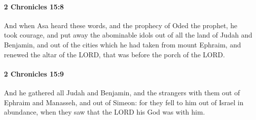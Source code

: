 		\paragraph{2 Chronicles 15:8} %
			\label{2CHRONICLES-15-8}

			And when Asa heard these words, and the prophecy of Oded the prophet, he took courage, and put away the abominable idols out of all the land of Judah and Benjamin, and out of the cities which he had taken from mount Ephraim, and renewed the altar of the LORD, that was before the porch of the LORD.


		\paragraph{2 Chronicles 15:9} %
			\label{2CHRONICLES-15-9}

			And he gathered all Judah and Benjamin, and the strangers with them out of Ephraim and Manasseh, and out of Simeon: for they fell to him out of Israel in abundance, when they saw that the LORD his God was with him.

